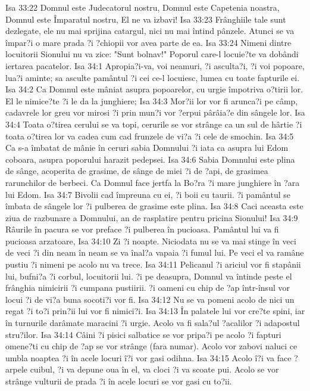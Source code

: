 Isa 33:22  Domnul este Judecatorul nostru, Domnul este Capetenia noastra, Domnul este Împaratul nostru, El ne va izbavi!
Isa 33:23  Frânghiile tale sunt dezlegate, ele nu mai sprijina catargul, nici nu mai întind pânzele. Atunci se va împar?i o mare prada ?i ?chiopii vor avea parte de ea.
Isa 33:24  Nimeni dintre locuitorii Sionului nu va zice: "Sunt bolnav!" Poporul care-l locuie?te va dobândi iertarea pacatelor.
Isa 34:1  Apropia?i-va, voi neamuri, ?i asculta?i, ?i voi popoare, lua?i aminte; sa asculte pamântul ?i cei ce-l locuiesc, lumea cu toate fapturile ei.
Isa 34:2  Ca Domnul este mâniat asupra popoarelor, cu urgie împotriva o?tirii lor. El le nimice?te ?i le da la junghiere;
Isa 34:3  Mor?ii lor vor fi arunca?i pe câmp, cadavrele lor greu vor mirosi ?i prin mun?i vor ?erpui pârâia?e din sângele lor.
Isa 34:4  Toata o?tirea cerului se va topi, cerurile se vor strânge ca un sul de hârtie ?i toata o?tirea lor va cadea cum cad frunzele de vi?a ?i cele de smochin.
Isa 34:5  Ca s-a îmbatat de mânie în ceruri sabia Domnului ?i iata ca asupra lui Edom coboara, asupra poporului harazit pedepsei.
Isa 34:6  Sabia Domnului este plina de sânge, acoperita de grasime, de sânge de miei ?i de ?api, de grasimea rarunchilor de berbeci. Ca Domnul face jertfa la Bo?ra ?i mare junghiere în ?ara lui Edom.
Isa 34:7  Bivolii cad împreuna cu ei, ?i boii cu taurii. ?i pamântul se îmbata de sângele lor ?i pulberea de grasime este plina.
Isa 34:8  Caci aceasta este ziua de razbunare a Domnului, an de rasplatire pentru pricina Sionului!
Isa 34:9  Râurile în pacura se vor preface ?i pulberea în pucioasa. Pamântul lui va fi pucioasa arzatoare,
Isa 34:10  Zi ?i noapte. Niciodata nu se va mai stinge în veci de veci ?i din neam în neam se va înal?a vapaia ?i fumul lui. Pe veci el va ramâne pustiu ?i nimeni pe acolo nu va trece.
Isa 34:11  Pelicanul ?i ariciul vor fi stapânii lui, bufni?a ?i corbul, locuitorii lui. ?i pe deasupra, Domnul va întinde peste el frânghia nimicirii ?i cumpana pustiirii. ?i oameni cu chip de ?ap într-însul vor locui ?i de vi?a buna socoti?i vor fi.
Isa 34:12  Nu se va pomeni acolo de nici un regat ?i to?i prin?ii lui vor fi nimici?i.
Isa 34:13  În palatele lui vor cre?te spini, iar în turnurile darâmate maracini ?i urgie. Acolo va fi sala?ul ?acalilor ?i adapostul stru?ilor.
Isa 34:14  Câini ?i pisici salbatice se vor pripa?i pe acolo ?i fapturi omene?ti cu chip de ?ap se vor strânge (fara numar). Acolo vor zabovi naluci ce umbla noaptea ?i în acele locuri î?i vor gasi odihna.
Isa 34:15  Acolo î?i va face ?arpele cuibul, ?i va depune oua în el, va cloci ?i va scoate pui. Acolo se vor strânge vulturii de prada ?i în acele locuri se vor gasi cu to?ii.
